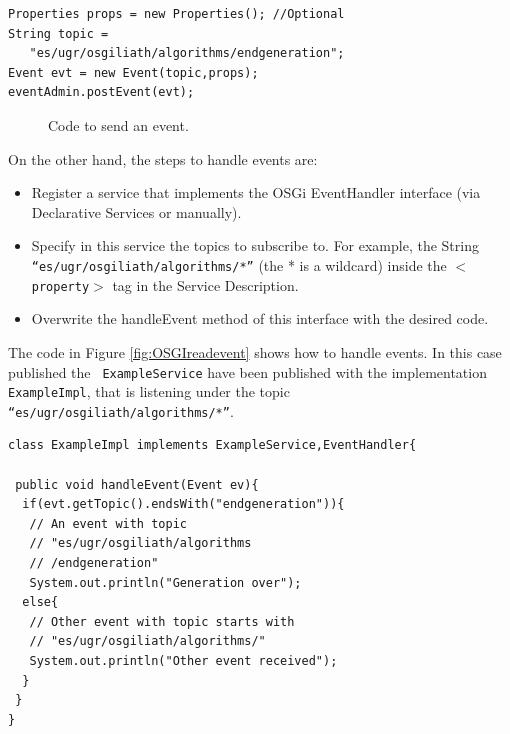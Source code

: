 \newsavebox{\mintedboxOSGIpostevent}
\begin{lrbox}{\mintedboxOSGIpostevent}
\begin{minipage}{10cm}
\begin{verbatim}
Properties props = new Properties(); //Optional
String topic = 
   "es/ugr/osgiliath/algorithms/endgeneration";
Event evt = new Event(topic,props);
eventAdmin.postEvent(evt);
\end{verbatim}
\end{minipage}
\end{lrbox}

\begin{figure}
\usebox{\mintedboxOSGIpostevent}
\caption{Code to send an event.}
\label{fig:OSGIpostevent} 
\end{figure}
		
On the other hand, the steps to handle events are:
\begin{itemize}
\item Register a service that implements the OSGi EventHandler interface (via Declarative Services or manually).
\item Specify in this service the topics to subscribe to. For example, the String \texttt{ ``es\-/ugr\-/os\-gi\-li\-ath/al\-go\-ri\-thms/*''} (the * is a wildcard) inside the \texttt{$<$property$>$} tag in the Service Description.
\item Overwrite the handleEvent method of this interface with the desired code.
\end{itemize}

The code  in Figure \ref{fig:OSGIreadevent} shows how to handle events. In this case published the \texttt{ ExampleService} have been published with the implementation \texttt{ ExampleImpl}, that is listening under the topic \texttt{ ``es/ugr/osgiliath/algorithms/*''}.



\newsavebox{\mintedboxOSGIreadevent}
\begin{lrbox}{\mintedboxOSGIreadevent}
\begin{minipage}{10cm}
\begin{verbatim}
class ExampleImpl implements ExampleService,EventHandler{

 public void handleEvent(Event ev){
  if(evt.getTopic().endsWith("endgeneration")){
   // An event with topic 
   // "es/ugr/osgiliath/algorithms
   // /endgeneration"
   System.out.println("Generation over");
  else{
   // Other event with topic starts with
   // "es/ugr/osgiliath/algorithms/"
   System.out.println("Other event received");
  }
 }
}
\end{verbatim}
\end{minipage}
\end{lrbox}

